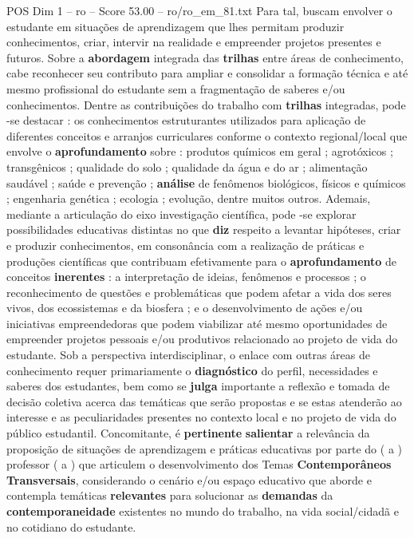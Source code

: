 \begin{textsample}{POS Dim 1 – ro – Score 53.00 – ro/ro\_em\_81.txt}
Para tal, buscam envolver o estudante em situações de aprendizagem que lhes permitam produzir conhecimentos, criar, intervir na realidade e empreender projetos presentes e futuros.
Sobre a \textbf{abordagem} integrada das \textbf{trilhas} entre áreas de conhecimento, cabe reconhecer seu contributo para ampliar e consolidar a formação técnica e até mesmo profissional do estudante sem a fragmentação de saberes e/ou conhecimentos.
Dentre as contribuições do trabalho com \textbf{trilhas} integradas, pode -se destacar : os conhecimentos estruturantes utilizados para aplicação de diferentes conceitos e arranjos curriculares conforme o contexto regional/local que envolve o \textbf{aprofundamento} sobre : produtos químicos em geral ; agrotóxicos ; transgênicos ; qualidade do solo ; qualidade da água e do ar ; alimentação saudável ; saúde e prevenção ; \textbf{análise} de fenômenos biológicos, físicos e químicos ; engenharia genética ; ecologia ; evolução, dentre muitos outros.
Ademais, mediante a articulação do eixo investigação científica, pode -se explorar possibilidades educativas distintas no que \textbf{diz} respeito a levantar hipóteses, criar e produzir conhecimentos, em consonância com a realização de práticas e produções científicas que contribuam efetivamente para o \textbf{aprofundamento} de conceitos \textbf{inerentes} : a interpretação de ideias, fenômenos e processos ; o reconhecimento de questões e problemáticas que podem afetar a vida dos seres vivos, dos ecossistemas e da biosfera ; e o desenvolvimento de ações e/ou iniciativas empreendedoras que podem viabilizar até mesmo oportunidades de empreender projetos pessoais e/ou produtivos relacionado ao projeto de vida do estudante.
Sob a perspectiva interdisciplinar, o enlace com outras áreas de conhecimento requer primariamente o \textbf{diagnóstico} do perfil, necessidades e saberes dos estudantes, bem como se \textbf{julga} importante a reflexão e tomada de decisão coletiva acerca das temáticas que serão propostas e se estas atenderão ao interesse e as peculiaridades presentes no contexto local e no projeto de vida do público estudantil.
Concomitante, é \textbf{pertinente} \textbf{salientar} a relevância da proposição de situações de aprendizagem e práticas educativas por parte do ( a ) professor ( a ) que articulem o desenvolvimento dos Temas \textbf{Contemporâneos} \textbf{Transversais}, considerando o cenário e/ou espaço educativo que aborde e contempla temáticas \textbf{relevantes} para solucionar as \textbf{demandas} da \textbf{contemporaneidade} existentes no mundo do trabalho, na vida social/cidadã e no cotidiano do estudante.

\end{textsample}
